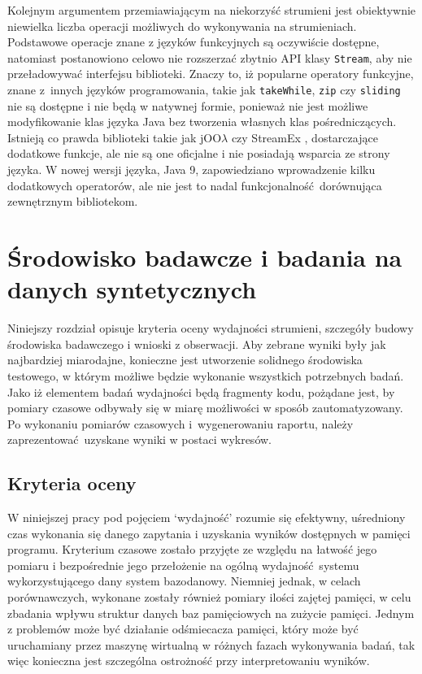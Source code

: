 \documentclass[12pt,twoside,openright]{extarticle}
\begin{document}
    Kolejnym argumentem przemiawiającym na niekorzyść strumieni jest obiektywnie niewielka liczba operacji możliwych do wykonywania na strumieniach. Podstawowe operacje znane z języków funkcyjnych są oczywiście dostępne, natomiast postanowiono celowo nie rozszerzać zbytnio API klasy \texttt{Stream}, aby nie przeładowywać interfejsu biblioteki. Znaczy to, iż popularne operatory funkcyjne, znane z~innych języków programowania, takie jak \texttt{takeWhile}, \texttt{zip} czy \texttt{sliding} nie są dostępne i nie będą w natywnej formie, ponieważ nie jest możliwe modyfikowanie klas języka Java bez tworzenia własnych klas pośredniczących. Istnieją co prawda biblioteki takie jak jOO$\lambda$ \cite{joolambda} czy StreamEx \cite{streamex}, dostarczające dodatkowe funkcje, ale nie są one oficjalne i nie posiadają wsparcia ze strony języka. W nowej wersji języka, Java 9, zapowiedziano wprowadzenie kilku dodatkowych operatorów, ale nie jest to nadal funkcjonalność dorównująca zewnętrznym bibliotekom.


\cleardoublepage
\section{Środowisko badawcze i badania na danych syntetycznych}

    Niniejszy rozdział opisuje kryteria oceny wydajności strumieni, szczegóły budowy środowiska badawczego i wnioski z obserwacji. Aby zebrane wyniki były jak najbardziej miarodajne, konieczne jest utworzenie solidnego środowiska testowego, w którym możliwe będzie wykonanie wszystkich potrzebnych badań. Jako iż elementem badań wydajności będą fragmenty kodu, pożądane jest, by pomiary czasowe odbywały się w miarę możliwości w sposób zautomatyzowany. Po wykonaniu pomiarów czasowych i~wygenerowaniu raportu, należy zaprezentować uzyskane wyniki w postaci wykresów.

\subsection{Kryteria oceny}

    W niniejszej pracy pod pojęciem `wydajność' rozumie się efektywny, uśredniony czas wykonania się danego zapytania i uzyskania wyników dostępnych w pamięci programu. Kryterium czasowe zostało przyjęte ze względu na łatwość jego pomiaru i bezpośrednie jego przełożenie na ogólną wydajność systemu wykorzystującego dany system bazodanowy. Niemniej jednak, w celach porównawczych, wykonane zostały również pomiary ilości zajętej pamięci, w celu zbadania wpływu struktur danych baz pamięciowych na zużycie pamięci. Jednym z problemów może być działanie odśmiecacza pamięci, który może być uruchamiany przez maszynę wirtualną w różnych fazach wykonywania badań, tak więc konieczna jest szczególna ostrożność przy interpretowaniu wyników.
\end{document}
